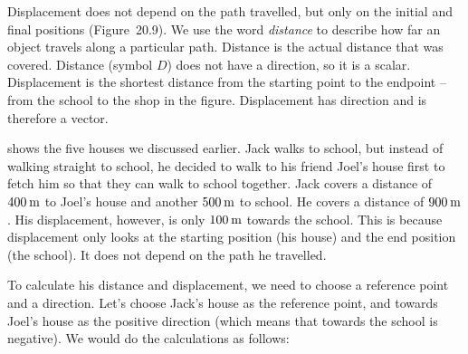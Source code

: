       \label{m38788*id63218}Displacement does not depend on the path travelled, but only on the initial and final positions (Figure~20.9). We use the word \textsl{distance} to describe how far an object travels along a particular path. Distance is the actual distance that was covered. Distance (symbol \begin{math}D\end{math}) does not have a direction, so it is a scalar. Displacement is the shortest distance from the starting point to the endpoint -- from the school to the shop in the figure. Displacement has direction and is therefore a vector.\par 
      \label{m38788*id62109} shows the five houses we discussed earlier. Jack walks to school, but instead of walking straight to school, he decided to walk to his friend Joel's house first to fetch him so that they can walk to school together. Jack covers a distance of \begin{math}400\phantom{\rule{2pt}{0ex}}\mathrm{m}\end{math} to Joel's house and another \begin{math}500\phantom{\rule{2pt}{0ex}}\mathrm{m}\end{math} to school. He covers a distance of \begin{math}900\phantom{\rule{2pt}{0ex}}\mathrm{m}\end{math}. His displacement, however, is only \begin{math}100\phantom{\rule{2pt}{0ex}}\mathrm{m}\end{math} towards the school. This is because displacement only looks at the starting position (his house) and the end position (the school). It does not depend on the path he travelled.\par 
      \label{m38788*id62121}To calculate his distance and displacement, we need to choose a reference point and a direction. Let's choose Jack's house as the reference point, and towards Joel's house as the positive direction (which means that towards the school is negative). We would do the calculations as follows:\par 
      \label{m38788*id63444}\label{m38788*id63450}\nopagebreak\noindent{}
